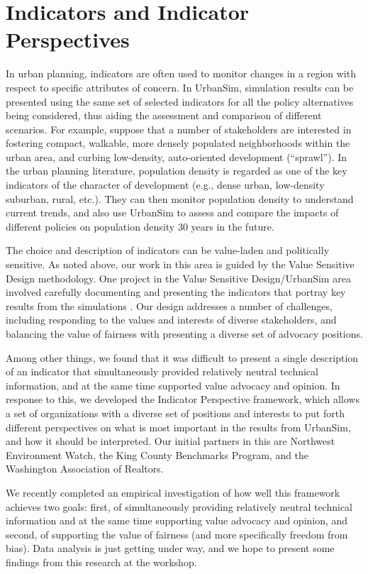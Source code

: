 \documentclass{acm_proc_article-sp}
\begin{document}
\section{Indicators and Indicator Perspectives}

In urban planning, indicators \cite{gallopin-1997,hart-book-1999} are often
used to monitor changes in a region with respect to specific attributes of
concern.  In UrbanSim, simulation results can be presented using the same
set of selected indicators for all the policy alternatives being
considered, thus aiding the assessment and comparison of different
scenarios.  For example, suppose that a number of stakeholders are
interested in fostering compact, walkable, more densely populated
neighborhoods within the urban area, and curbing low-density, auto-oriented
development (``sprawl'').  In the urban planning literature, population
density is regarded as one of the key indicators of the character of
development (e.g., dense urban, low-density suburban, rural, etc.).  They
can then monitor population density to understand current trends, and also
use UrbanSim to assess and compare the impacts of different policies on
population density 30 years in the future.

The choice and description of indicators can be value-laden and politically
sensitive.  As noted above, our work in this area is guided by the Value
Sensitive Design methodology.  One project in the Value Sensitive
Design/UrbanSim area involved carefully documenting and presenting the
indicators that portray key results from the simulations
\cite{borning-ecscw-2005}.  Our design addresses a number of challenges,
including responding to the values and interests of diverse stakeholders,
and balancing the value of fairness with presenting a diverse set of
advocacy positions.

Among other things, we found that it was difficult to present a single
description of an indicator that simultaneously provided relatively neutral
technical information, and at the same time supported value advocacy and
opinion.  In response to this, we developed the Indicator Perspective
framework, which allows a set of organizations with a diverse set of
positions and interests to put forth different perspectives on what is most
important in the results from UrbanSim, and how it should be interpreted.
Our initial partners in this are Northwest Environment Watch, the King
County Benchmarks Program, and the Washington Association of Realtors.

We recently completed an empirical investigation of how well this framework
achieves two goals: first, of simultaneously providing relatively neutral
technical information and at the same time supporting value advocacy and
opinion, and second, of supporting the value of fairness (and more
specifically freedom from bias).  Data analysis is just getting under way,
and we hope to present some findings from this research at the workshop.
\end{document}

